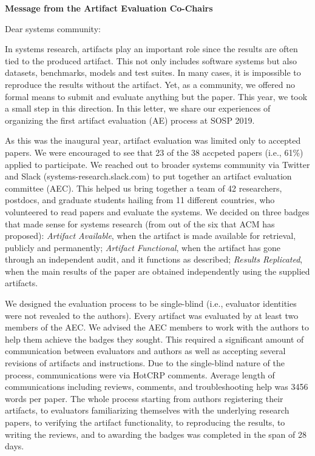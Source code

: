 \documentclass{letter}
\date{}
\begin{document}
\begin{letter}{\large \bf {Message from the Artifact Evaluation Co-Chairs}}
\opening{Dear systems community:}

In systems research, artifacts play an important role since the results are often tied to the produced artifact. This not only includes software systems but also datasets, benchmarks, models and test suites. In many cases, it is impossible to reproduce the results without the artifact. Yet, as a community, we offered no formal means to submit and evaluate anything but the paper. This year, we took a small step in this direction. In this letter, we share our experiences of organizing the first artifact evaluation (AE) process at SOSP 2019. 

As this was the inaugural year, artifact evaluation was limited only to accepted papers. We were encouraged to see that 23 of the 38 accpeted papers (i.e., 61\%) applied to participate. We reached out to broader systems community via Twitter and Slack (systems-research.slack.com) to put together an artifact evaluation committee (AEC). This helped us bring together a team of 42 researchers, postdocs, and graduate students hailing from 11 different countries, who volunteered to read papers and evaluate the systems. We decided on three badges that made sense for systems research (from out of the six that ACM has proposed): \emph{Artifact Available}, when the artifact is made available for retrieval, publicly and permanently; \emph{Artifact Functional}, when the artifact has gone through an independent audit, and it functions as described; \emph{Results Replicated}, when the main results of the paper are obtained independently using the supplied artifacts.

We designed the evaluation process to be single-blind (i.e., evaluator identities were not revealed to the authors). Every artifact was evaluated by at least two members of the AEC. We advised the AEC members to work with the authors to help them achieve the badges they sought. This required a significant amount of communication between evaluators and authors as well as accepting several revisions of artifacts and instructions. Due to the single-blind nature of the process, communications were via HotCRP comments. Average length of communications including reviews, comments, and troubleshooting help was 3456 words per paper. The whole process starting from authors registering their artifacts, to evaluators familiarizing themselves with the underlying research papers, to verifying the artifact functionality, to reproducing the results, to writing the reviews, and to awarding the badges was completed in the span of 28 days. 


\end{letter}
\end{document}
